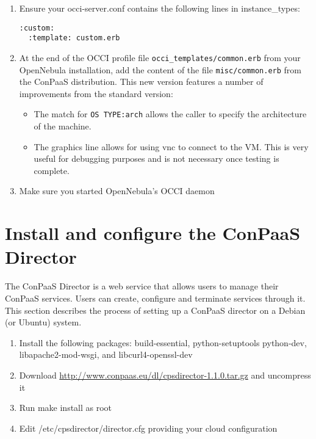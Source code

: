 \documentclass[10pt]{article}
\begin{document}
\begin{enumerate}
\item Ensure your occi-server.conf contains the following lines in instance\_types:
\begin{verbatim}
:custom:
  :template: custom.erb
\end{verbatim}
\item At the end of the OCCI profile file \verb+occi_templates/common.erb+ 
  from your OpenNebula installation, add the content of the file
  \verb+misc/common.erb+ from the ConPaaS distribution. This new version 
  features a number of improvements from the standard version:
  \begin{itemize}
  \item The match for \verb+OS TYPE:arch+ allows the caller to specify
    the architecture of the machine.
  \item The graphics line allows for using vnc to connect to the VM.
    This is very useful for debugging purposes and is not necessary
    once testing is complete.

  \end{itemize}

\item Make sure you started OpenNebula's OCCI daemon

\end{enumerate}

\section{Install and configure the ConPaaS Director}
\label{sec:director}

The ConPaaS Director is a web service that allows users to manage their ConPaaS
services. Users can create, configure and terminate services through it. This
section describes the process of setting up a ConPaaS director on a Debian (or
Ubuntu) system.

\begin{enumerate}
\item Install the following packages: build-essential, python-setuptools
  python-dev, libapache2-mod-wsgi, and libcurl4-openssl-dev
\item Download \url{http://www.conpaas.eu/dl/cpsdirector-1.1.0.tar.gz} and uncompress it
\item Run make install as root
\item Edit /etc/cpsdirector/director.cfg providing your cloud configuration
\end{enumerate}
\end{document}
